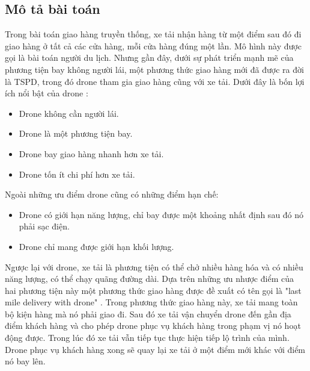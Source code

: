 \documentclass[a4paper,12pt]{report}
\begin{document}
\subsection{Mô tả bài toán}
Trong bài toán giao hàng truyền thống, xe tải nhận hàng từ một điểm sau đó đi giao hàng ở tất cả các cửa hàng, mỗi cửa hàng đúng một lần. Mô hình này được gọi là bài toán người du lịch. Nhưng gần đây, dưới sự phát triển mạnh mẽ của phương tiện bay không người lái, một phương thức giao hàng mới đã được ra đời là \ac{TSPD}, trong đó drone tham gia giao hàng cũng với xe tải. Dưới đây là bốn lợi ích nổi bật của drone \cite{main} :
\begin{itemize}
\item Drone không cần người lái.
\item Drone là một phương tiện bay.
\item Drone bay giao hàng nhanh hơn xe tải.
\item Drone tốn ít chi phí hơn xe tải.
\end{itemize}

Ngoài những ưu điểm drone cũng có những điểm hạn chế:

\begin{itemize}
\item Drone có giới hạn năng lượng, chỉ bay được một khoảng nhất định sau đó nó phải sạc điện.
\item Drone chỉ mang được giới hạn khối lượng.
\end{itemize}

Ngược lại với drone, xe tải là phương tiện có thể chở nhiều hàng hóa và có nhiều năng lượng, có thể chạy quãng đường dài. Dựa trên những ưu nhược điểm của hai phương tiện này một phương thức giao hàng được đề xuất có tên gọi là "last mile delivery with drone" \cite{bahiwww}. Trong phương thức giao hàng này, xe tải mang toàn bộ kiện hàng mà nó phải giao đi. Sau đó xe tải vận chuyển drone đến gần địa điểm khách hàng và cho phép drone phục vụ khách hàng trong phạm vị nó hoạt động được. Trong lúc đó xe tải vẫn tiếp tục thực hiện tiếp lộ trình của mình.  Drone phục vụ khách hàng xong sẽ quay lại xe tải ở một điểm mới khác với điểm nó bay lên. \\
\end{document}
